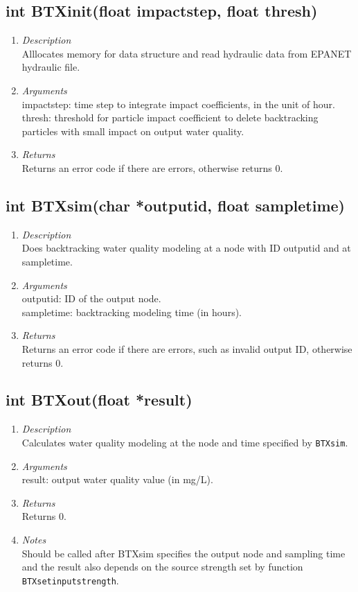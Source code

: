 \documentclass[12pt,letterpaper]{article}
\begin{document}
\subsection*{int BTXinit(float impactstep, float thresh)}
\begin{enumerate}
\item {\it Description}\\Alllocates memory for data structure and read hydraulic
data from EPANET hydraulic file.
\item {\it Arguments}\\impactstep: time step to integrate impact
coefficients, in the unit of hour.\\thresh: threshold for particle
impact coefficient to delete backtracking particles with small
impact on output water quality.
\item {\it Returns}\\Returns an error code if there are errors, otherwise returns 0.
\end{enumerate}

\subsection*{int BTXsim(char *outputid, float sampletime)}
\begin{enumerate}
\item {\it Description}\\Does backtracking water quality modeling at a node with ID outputid
and at sampletime.
\item {\it Arguments}
\\outputid: ID of the output node.\\sampletime: backtracking modeling time (in
hours).\item {\it Returns}\\Returns an error code if there are
errors, such as invalid output ID, otherwise
returns 0.
\end{enumerate}

\subsection*{int BTXout(float *result)}
\begin{enumerate}
\item {\it Description}\\Calculates water quality modeling at the node and
time specified by \texttt{BTXsim}.
\item {\it Arguments}
\\result: output water quality value (in mg/L).
\item {\it Returns}\\Returns 0.
\item {\it Notes}\\Should be called after BTXsim specifies the
output node and sampling time and the result also depends on the
source strength set by function \texttt{BTXsetinputstrength}.
\end{enumerate}
\end{document}
